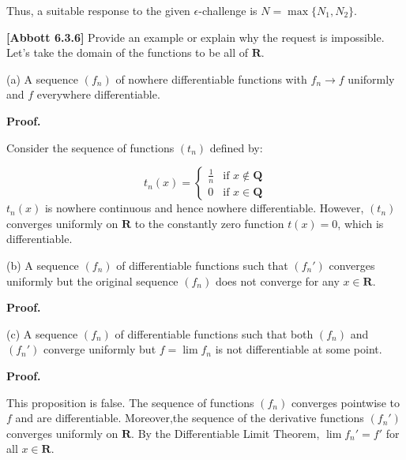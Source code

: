 \documentclass[10pt]{article}
\begin{document}
Thus, a suitable response to the given $\displaystyle \epsilon $-challenge is $\displaystyle N=\max\{N_{1} ,N_{2}\}$. 



\textbf{[Abbott 6.3.6] }Provide an example or explain why the request is impossible. Let's take the domain of the functions to be all of $\displaystyle \mathbf{R}$.

(a) A sequence $\displaystyle ( f_{n})$ of nowhere differentiable functions with $\displaystyle f_{n}\rightarrow f$ uniformly and $\displaystyle f$ everywhere differentiable.



\textbf{Proof.}



Consider the sequence of functions $\displaystyle ( t_{n})$ defined by:


\begin{equation*}
t_{n}( x) =\begin{cases}
\frac{1}{n} & \text{if } x\notin \mathbf{Q}\\
0 & \text{if } x\in \mathbf{Q}
\end{cases}
\end{equation*}
$\displaystyle t_{n}( x)$ is nowhere continuous and hence nowhere differentiable. However, $\displaystyle ( t_{n})$ converges uniformly on $\displaystyle \mathbf{R}$ to the constantly zero function $\displaystyle t( x) =0$, which is differentiable.



(b) A sequence $\displaystyle ( f_{n})$ of differentiable functions such that $\displaystyle ( f_{n} ')$ converges uniformly but the original sequence $\displaystyle ( f_{n})$ does not converge for any $\displaystyle x\in \mathbf{R}$. 



\textbf{Proof.} 







(c) A sequence $\displaystyle ( f_{n})$ of differentiable functions such that both $\displaystyle ( f_{n})$ and $\displaystyle ( f_{n} ')$ converge uniformly but $\displaystyle f=\lim f_{n}$ is not differentiable at some point.



\textbf{Proof.}



This proposition is false. The sequence of functions $\displaystyle ( f_{n})$ converges pointwise to $\displaystyle f$ and are differentiable. Moreover,the sequence of the derivative functions $\displaystyle ( f_{n} ')$ converges uniformly on $\displaystyle \mathbf{R}$. By the Differentiable Limit Theorem, $\displaystyle \lim f_{n} '=f'$ for all $\displaystyle x\in \mathbf{R}$.
\end{document}
